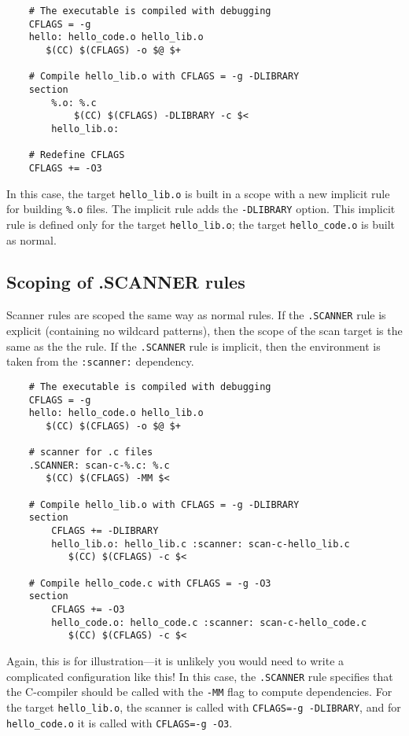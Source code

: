 \begin{verbatim}
    # The executable is compiled with debugging
    CFLAGS = -g
    hello: hello_code.o hello_lib.o
       $(CC) $(CFLAGS) -o $@ $+

    # Compile hello_lib.o with CFLAGS = -g -DLIBRARY
    section
        %.o: %.c
            $(CC) $(CFLAGS) -DLIBRARY -c $<
        hello_lib.o:

    # Redefine CFLAGS
    CFLAGS += -O3
\end{verbatim}

In this case, the target \verb+hello_lib.o+ is built in a scope with a new implicit rule for
building \verb+%.o+ files.  The implicit rule adds the \verb+-DLIBRARY+ option.  This implicit rule
is defined only for the target \verb+hello_lib.o+; the target \verb+hello_code.o+ is built as
normal.

\subsection{Scoping of .SCANNER rules}

Scanner rules are scoped the same way as normal rules.  If the \verb+.SCANNER+ rule is explicit
(containing no wildcard patterns), then the scope of the scan target is the same as the the rule.
If the \verb+.SCANNER+ rule is implicit, then the environment is taken from the \verb+:scanner:+
dependency.

\begin{verbatim}
    # The executable is compiled with debugging
    CFLAGS = -g
    hello: hello_code.o hello_lib.o
       $(CC) $(CFLAGS) -o $@ $+

    # scanner for .c files
    .SCANNER: scan-c-%.c: %.c
       $(CC) $(CFLAGS) -MM $<

    # Compile hello_lib.o with CFLAGS = -g -DLIBRARY
    section
        CFLAGS += -DLIBRARY
        hello_lib.o: hello_lib.c :scanner: scan-c-hello_lib.c
           $(CC) $(CFLAGS) -c $<

    # Compile hello_code.c with CFLAGS = -g -O3
    section
        CFLAGS += -O3
        hello_code.o: hello_code.c :scanner: scan-c-hello_code.c
           $(CC) $(CFLAGS) -c $<
\end{verbatim}

Again, this is for illustration---it is unlikely you would need to write a complicated configuration
like this!  In this case, the \verb+.SCANNER+ rule specifies that the C-compiler should be called
with the \verb+-MM+ flag to compute dependencies.  For the target \verb+hello_lib.o+, the scanner
is called with \verb+CFLAGS=-g -DLIBRARY+, and for \verb+hello_code.o+ it is called with
\verb+CFLAGS=-g -O3+.

